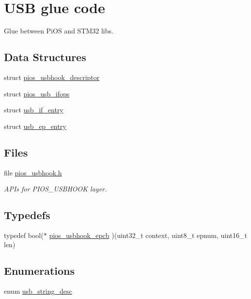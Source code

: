 \hypertarget{group___p_i_o_s___u_s_b_h_o_o_k}{\section{\-U\-S\-B glue code}
\label{group___p_i_o_s___u_s_b_h_o_o_k}
}


\-Glue between \-Pi\-O\-S and \-S\-T\-M32 libs.  


\subsection*{\-Data \-Structures}
\begin{DoxyCompactItemize}
\item 
struct \hyperlink{structpios__usbhook__descriptor}{pios\-\_\-usbhook\-\_\-descriptor}
\item 
struct \hyperlink{structpios__usb__ifops}{pios\-\_\-usb\-\_\-ifops}
\item 
struct \hyperlink{structusb__if__entry}{usb\-\_\-if\-\_\-entry}
\item 
struct \hyperlink{structusb__ep__entry}{usb\-\_\-ep\-\_\-entry}
\end{DoxyCompactItemize}
\subsection*{\-Files}
\begin{DoxyCompactItemize}
\item 
file \hyperlink{pios__usbhook_8h}{pios\-\_\-usbhook.\-h}
\begin{DoxyCompactList}\small\item\em \-A\-P\-Is for \-P\-I\-O\-S\-\_\-\-U\-S\-B\-H\-O\-O\-K layer. \end{DoxyCompactList}\end{DoxyCompactItemize}
\subsection*{\-Typedefs}
\begin{DoxyCompactItemize}
\item 
typedef bool($\ast$ \hyperlink{group___p_i_o_s___u_s_b_h_o_o_k_ga5f7904cd3922ab7207afebe3d9ef2650}{pios\-\_\-usbhook\-\_\-epcb} )(uint32\-\_\-t context, uint8\-\_\-t epnum, uint16\-\_\-t len)
\end{DoxyCompactItemize}
\subsection*{\-Enumerations}
\begin{DoxyCompactItemize}
\item 
enum \hyperlink{group___p_i_o_s___u_s_b_h_o_o_k_ga5a1ae5206971f0c296fa30b24e8725da}{usb\-\_\-string\-\_\-desc} 
\end{DoxyCompactItemize}
